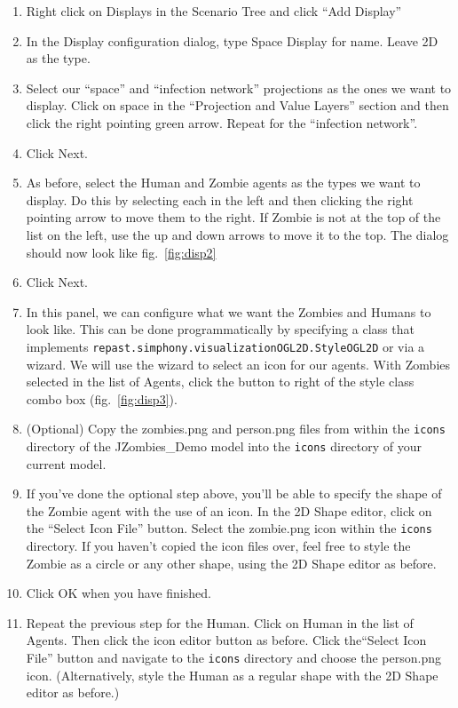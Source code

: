 \documentclass[11pt]{amsart}
\begin{document}
\vspace{.2in}
\begin{enumerate}
\item Right click on Displays in the Scenario Tree and click ``Add Display''
\item In the Display configuration dialog, type Space Display for name. Leave 2D as the type.
\item Select our ``space'' and ``infection network'' projections as the ones we want to display. Click on space in the ``Projection and Value Layers'' section and then click the right pointing green arrow. Repeat for the ``infection network''.
\item Click Next.
\item As before, select the Human and Zombie agents as the types we want to display. Do this by selecting each in the left and then clicking the right pointing arrow to move them to the right. If Zombie is not at the top of the list on the left, use the up and down arrows to move it to the top. The dialog should now look like fig.~\ref{fig:disp2}
\item Click Next.
\item In this panel, we can configure what we want the Zombies and Humans to look like. This can be done programmatically by specifying a class that implements \texttt{repast.simphony.visualizationOGL2D.StyleOGL2D} or via a wizard. We will use the wizard to select an icon for our agents. With Zombies selected in the list of Agents, click the button to right of the style class combo box (fig.~\ref{fig:disp3}).
\item (Optional) Copy the zombies.png and person.png files from within the \texttt{icons} directory of the JZombies\_Demo model into the \texttt{icons} directory of your current model.
\item If you've done the optional step above, you'll be able to specify the shape of the Zombie agent with the use of an icon. In the 2D Shape editor, click on the ``Select Icon File'' button. Select the zombie.png icon within the \texttt{icons} directory. If you haven't copied the icon files over, feel free to style the Zombie as a circle or any other shape, using the 2D Shape editor as before.
\item Click OK when you have finished.
\item Repeat the previous step for the Human. Click on Human in the list of Agents. Then click the icon editor button as before. Click the``Select Icon File'' button and navigate to the \texttt{icons} directory and choose the person.png icon. (Alternatively, style the Human as a regular shape with the 2D Shape editor as before.)

\end{enumerate}
\end{document}
